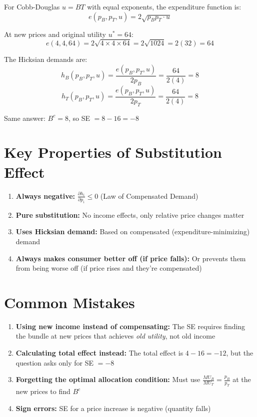 \documentclass[11pt]{article}
\begin{document}
For Cobb-Douglas $u = BT$ with equal exponents, the expenditure function is:
$$e(p_B, p_T, u) = 2\sqrt{p_B p_T \cdot u}$$

At new prices and original utility $u^* = 64$:
$$e(4, 4, 64) = 2\sqrt{4 \times 4 \times 64} = 2\sqrt{1024} = 2(32) = 64$$

The Hicksian demands are:
$$h_B(p_B, p_T, u) = \frac{e(p_B, p_T, u)}{2p_B} = \frac{64}{2(4)} = 8$$
$$h_T(p_B, p_T, u) = \frac{e(p_B, p_T, u)}{2p_T} = \frac{64}{2(4)} = 8$$

Same answer: $B^c = 8$, so SE $= 8 - 16 = -8$ \checkmark

\section{Key Properties of Substitution Effect}

\begin{enumerate}
    \item \textbf{Always negative:} $\frac{\partial h_i}{\partial p_i} \leq 0$ (Law of Compensated Demand)

    \item \textbf{Pure substitution:} No income effects, only relative price changes matter

    \item \textbf{Uses Hicksian demand:} Based on compensated (expenditure-minimizing) demand

    \item \textbf{Always makes consumer better off (if price falls):} Or prevents them from being worse off (if price rises and they're compensated)
\end{enumerate}

\section{Common Mistakes}

\begin{enumerate}
    \item \textbf{Using new income instead of compensating:} The SE requires finding the bundle at new prices that achieves \textit{old utility}, not old income

    \item \textbf{Calculating total effect instead:} The total effect is $4 - 16 = -12$, but the question asks only for SE $= -8$

    \item \textbf{Forgetting the optimal allocation condition:} Must use $\frac{MU_B}{MU_T} = \frac{p_B}{p_T}$ at the new prices to find $B^c$

    \item \textbf{Sign errors:} SE for a price increase is negative (quantity falls)
\end{enumerate}
\end{document}
